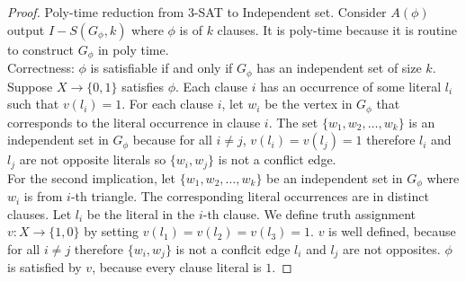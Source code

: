 \documentclass[a4paper]{article}
\theoremstyle{plain}
\theoremstyle{definition}
\theoremstyle{remark}
\begin{document}
	\begin{proof}
		Poly-time reduction from $3$-SAT to Independent set. Consider $A(\phi)$ output $I-S(G_\phi,k)$ where $\phi$ is of $k$ clauses. It is poly-time because it is routine to construct $G_\phi$ in poly time. \\
		Correctness: $\phi$ is satisfiable if and only if $G_\phi$ has an independent set of size $ k$. \\
		Suppose $X \to \{0,1\}$ satisfies $\phi$. Each clause $i$ has an occurrence of some literal $l_i$ such that $v(l_i) = 1$. For each clause $i$, let $w_i$ be the vertex in $G_\phi$ that corresponds to the literal occurrence in clause $i$. The set $\{w_1,w_2,\ldots,w_k\}$ is an independent set in $G_\phi$ because for all $i \neq j$, $v(l_i) = v(l_j) = 1$ therefore $l_i$ and $l_j$ are not opposite literals so $\{w_i,w_j\}$ is not a conflict edge. \\
		For the second implication, let $\{w_1,w_2,\ldots,w_k\}$ be an independent set in $G_\phi$ where $w_i$ is from $i$-th triangle. The corresponding literal occurrences are in distinct clauses. Let $l_i$ be the literal in the $i$-th clause. We define truth assignment $v:X \to \{1,0\}$ by setting $v(l_1)=v(l_2)=v(l_3) = 1$. $v$ is well defined, because for all $i \neq j$ therefore $\{w_i,w_j\}$ is not a conflcit edge $l_i$ and $l_j$ are not opposites. $\phi$ is satisfied by $v$, because every clause literal is $1$.
	\end{proof}
\end{document}
